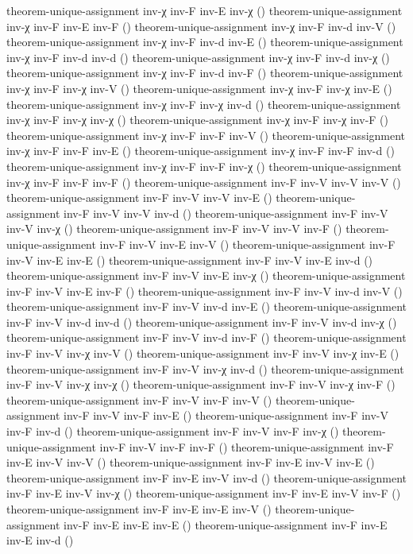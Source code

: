 \documentclass[11pt,a4paper]{article}
\begin{document}
\begin{code}
theorem-unique-assignment inv-χ inv-F inv-E inv-χ ()
theorem-unique-assignment inv-χ inv-F inv-E inv-F ()
theorem-unique-assignment inv-χ inv-F inv-d inv-V ()
theorem-unique-assignment inv-χ inv-F inv-d inv-E ()
theorem-unique-assignment inv-χ inv-F inv-d inv-d ()
theorem-unique-assignment inv-χ inv-F inv-d inv-χ ()
theorem-unique-assignment inv-χ inv-F inv-d inv-F ()
theorem-unique-assignment inv-χ inv-F inv-χ inv-V ()
theorem-unique-assignment inv-χ inv-F inv-χ inv-E ()
theorem-unique-assignment inv-χ inv-F inv-χ inv-d ()
theorem-unique-assignment inv-χ inv-F inv-χ inv-χ ()
theorem-unique-assignment inv-χ inv-F inv-χ inv-F ()
theorem-unique-assignment inv-χ inv-F inv-F inv-V ()
theorem-unique-assignment inv-χ inv-F inv-F inv-E ()
theorem-unique-assignment inv-χ inv-F inv-F inv-d ()
theorem-unique-assignment inv-χ inv-F inv-F inv-χ ()
theorem-unique-assignment inv-χ inv-F inv-F inv-F ()
theorem-unique-assignment inv-F inv-V inv-V inv-V ()
theorem-unique-assignment inv-F inv-V inv-V inv-E ()
theorem-unique-assignment inv-F inv-V inv-V inv-d ()
theorem-unique-assignment inv-F inv-V inv-V inv-χ ()
theorem-unique-assignment inv-F inv-V inv-V inv-F ()
theorem-unique-assignment inv-F inv-V inv-E inv-V ()
theorem-unique-assignment inv-F inv-V inv-E inv-E ()
theorem-unique-assignment inv-F inv-V inv-E inv-d ()
theorem-unique-assignment inv-F inv-V inv-E inv-χ ()
theorem-unique-assignment inv-F inv-V inv-E inv-F ()
theorem-unique-assignment inv-F inv-V inv-d inv-V ()
theorem-unique-assignment inv-F inv-V inv-d inv-E ()
theorem-unique-assignment inv-F inv-V inv-d inv-d ()
theorem-unique-assignment inv-F inv-V inv-d inv-χ ()
theorem-unique-assignment inv-F inv-V inv-d inv-F ()
theorem-unique-assignment inv-F inv-V inv-χ inv-V ()
theorem-unique-assignment inv-F inv-V inv-χ inv-E ()
theorem-unique-assignment inv-F inv-V inv-χ inv-d ()
theorem-unique-assignment inv-F inv-V inv-χ inv-χ ()
theorem-unique-assignment inv-F inv-V inv-χ inv-F ()
theorem-unique-assignment inv-F inv-V inv-F inv-V ()
theorem-unique-assignment inv-F inv-V inv-F inv-E ()
theorem-unique-assignment inv-F inv-V inv-F inv-d ()
theorem-unique-assignment inv-F inv-V inv-F inv-χ ()
theorem-unique-assignment inv-F inv-V inv-F inv-F ()
theorem-unique-assignment inv-F inv-E inv-V inv-V ()
theorem-unique-assignment inv-F inv-E inv-V inv-E ()
theorem-unique-assignment inv-F inv-E inv-V inv-d ()
theorem-unique-assignment inv-F inv-E inv-V inv-χ ()
theorem-unique-assignment inv-F inv-E inv-V inv-F ()
theorem-unique-assignment inv-F inv-E inv-E inv-V ()
theorem-unique-assignment inv-F inv-E inv-E inv-E ()
theorem-unique-assignment inv-F inv-E inv-E inv-d ()

\end{code}
\end{document}

